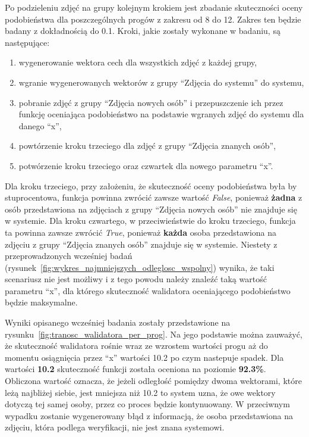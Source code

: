 Po podzieleniu zdjęć na grupy kolejnym krokiem jest zbadanie skuteczności
oceny podobieństwa dla poszczególnych
progów z zakresu od \num{8} do \num{12}.
Zakres ten będzie badany z dokładnością do \num{0.1}.
Kroki, jakie zostały wykonane w badaniu, są następujące:

\begin{enumerate}
    \item wygenerowanie wektora cech dla wszystkich zdjęć z każdej grupy,
    \item wgranie wygenerowanych wektorów z grupy ``Zdjęcia do systemu'' do systemu,
    \item pobranie zdjęć z grupy ``Zdjęcia nowych osób'' i przepuszczenie ich przez
    funkcję oceniająca podobieństwo na podstawie wgranych zdjęć do systemu dla danego ``x'',
    \item powtórzenie kroku trzeciego dla zdjęć z grupy ``Zdjęcia znanych osób'',
    \item potwórzenie kroku trzeciego oraz czwartek dla nowego parametru ``x''.
\end{enumerate}

Dla kroku trzeciego, przy założeniu, że skuteczność oceny podobieństwa była by stuprocentowa, funkcja
powinna zwrócić zawsze wartość \textit{False}, ponieważ \textbf{żadna} z osób przedstawiona
na zdjęciach z grupy ``Zdjęcia nowych osób'' nie znajduje się w systemie.
Dla kroku czwartego, w przeciwieństwie do kroku trzeciego, funkcja ta powinna
zawsze zwrócić \textit{True}, ponieważ \textbf{każda}
osoba przedstawiona na zdjęciu z grupy ``Zdjęcia znanych osób'' znajduje się w systemie.
Niestety z przeprowadzonych wcześniej badań (rysunek~\ref{fig:wykres_najmniejszych_odleglosc_wspolny}) wynika,
że taki scenariusz nie jest możliwy i z tego powodu należy znaleźć taką wartość parametru ``x'',
dla którego skuteczność walidatora oceniającego podobieństwo będzie maksymalne.

Wyniki opisanego wcześniej badania zostały przedstawione na rysunku~\ref{fig:tranosc_walidatora_per_prog}.
Na jego podstawie można zauważyć, że skuteczność walidatora
rośnie wraz ze wzrostem wartości progu aż do momentu osiągnięcia
przez ``x'' wartości \num{10.2} po czym nastepuje spadek.
Dla wartości \textbf{10.2} skuteczność funkcji została oceniona na poziomie \textbf{92.3\%}.
Obliczona wartość oznacza, że jeżeli odległość pomiędzy dwoma wektorami, które leżą najbliżej siebie,
jest mniejsza niż \num{10.2} to system uzna, że owe wektory dotyczą tej samej osoby,
przez co proces będzie kontynuowany.
W przeciwnym wypadku zostanie wygenerowany błąd z informacją, że osoba przedstawiona na zdjęciu,
która podlega weryfikacji, nie jest znana systemowi.

